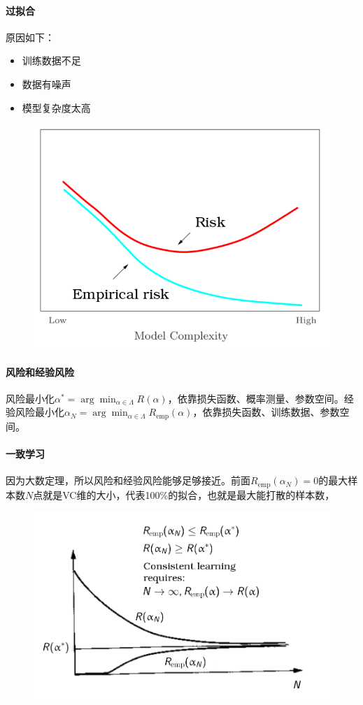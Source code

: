 \paragraph{过拟合} 原因如下：
\begin{itemize}
    \item 训练数据不足
    \item 数据有噪声
    \item 模型复杂度太高
\end{itemize}

\begin{figure}[H]
    \centering
\includegraphics[width=0.7\columnwidth]{sl/2.png}
\end{figure}

\paragraph{风险和经验风险}
风险最小化$\alpha^*=\arg\min_{\alpha \in \Lambda} R(\alpha)$，依靠损失函数、概率测量、参数空间。经验风险最小化$\alpha_N=\arg\min_{\alpha \in \Lambda} R_\text{emp}(\alpha)$，依靠损失函数、训练数据、参数空间。

\paragraph{一致学习} 因为大数定理，所以风险和经验风险能够足够接近。前面$R_\text{emp}(\alpha_N) = 0$的最大样本数$N$点就是VC维的大小，代表100\%的拟合，也就是最大能打散的样本数，
\begin{figure}[H]
    \centering
\includegraphics[width=0.7\columnwidth]{sl/3.png}
\end{figure}

